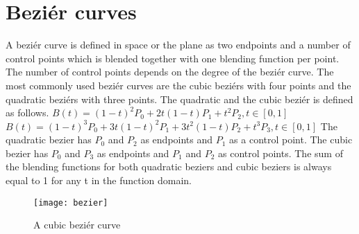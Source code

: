 \section{Beziér curves}\label{bezier}
A beziér curve is defined in space or the plane as two endpoints and a number of control points which is blended together with one blending function per point. The number of control points depends on the degree of the beziér curve. The most commonly used beziér curves are the cubic beziérs with four points and the quadratic beziérs with three points. The quadratic and the cubic beziér is defined as follows.\vspace{\baselineskip}\newline
\begin{math}
B(t) = (1-t)^2P_0+2t(1-t)P_1+t^2P_2, t\in[0, 1] 
\end{math} \vspace{\baselineskip}\newline
\begin{math}
B(t) = (1 - t)^3P_0 + 3t(1 - t)^2P_1 + 3t^2(1 - t)P_2 + t^3P_3, t\in[0, 1]
\end{math} \vspace{\baselineskip}\newline
The quadratic bezier has $P_0$ and $P_2$ as endpoints and $P_1$ as a control point. The cubic bezier has $P_0$ and $P_3$ as endpoints and $P_1$ and $P_2$ as control points. The sum of the blending functions for both quadratic beziers and cubic beziers is always equal to 1 for any t in the function domain.\citep{PFNP}

\begin{figure}[H]
\texttt{[image: bezier]}
\caption{A cubic beziér curve}
\end{figure}

